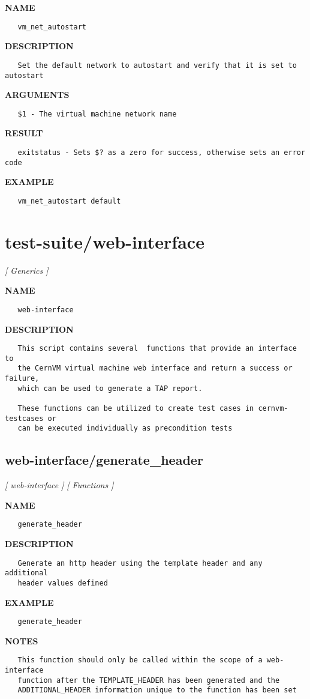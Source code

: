 \label{ch:robo70}
\label{ch:virt_interface_vm_net_autostart}
\textbf{NAME}
\begin{verbatim}
   vm_net_autostart
\end{verbatim}
\textbf{DESCRIPTION}
\begin{verbatim}
   Set the default network to autostart and verify that it is set to autostart
\end{verbatim}
\textbf{ARGUMENTS}
\begin{verbatim}
   $1 - The virtual machine network name
\end{verbatim}
\textbf{RESULT}
\begin{verbatim}
   exitstatus - Sets $? as a zero for success, otherwise sets an error code
\end{verbatim}
\textbf{EXAMPLE}
\begin{verbatim}
   vm_net_autostart default
\end{verbatim}
\newpage
\section{test-suite/web-interface}
\textsl{[ Generics ]}

\label{ch:robo45}
\label{ch:test_suite_web_interface}
\textbf{NAME}
\begin{verbatim}
   web-interface
\end{verbatim}
\textbf{DESCRIPTION}
\begin{verbatim}
   This script contains several  functions that provide an interface to
   the CernVM virtual machine web interface and return a success or failure, 
   which can be used to generate a TAP report.

   These functions can be utilized to create test cases in cernvm-testcases or 
   can be executed individually as precondition tests
\end{verbatim}
\newpage
\subsection{web-interface/generate\_header}
\textsl{[ web-interface ]}
\textsl{[ Functions ]}

\label{ch:robo71}
\label{ch:web_interface_generate_header}
\textbf{NAME}
\begin{verbatim}
   generate_header
\end{verbatim}
\textbf{DESCRIPTION}
\begin{verbatim}
   Generate an http header using the template header and any additional 
   header values defined
\end{verbatim}
\textbf{EXAMPLE}
\begin{verbatim}
   generate_header
\end{verbatim}
\textbf{NOTES}
\begin{verbatim}
   This function should only be called within the scope of a web-interface
   function after the TEMPLATE_HEADER has been generated and the 
   ADDITIONAL_HEADER information unique to the function has been set
\end{verbatim}
\newpage
